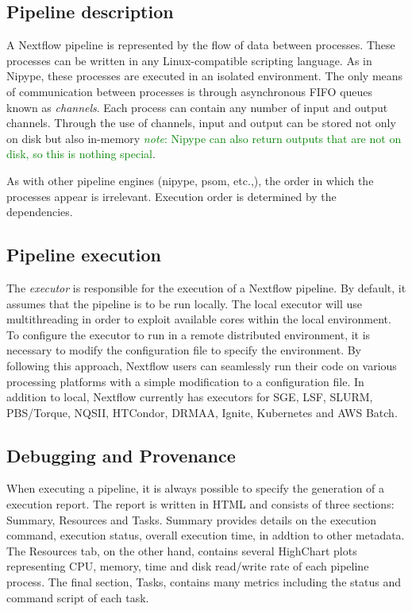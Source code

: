 \documentclass{report}
\newcommand{\note}[1]{\textcolor{green}{\textit{note}: #1}}
\begin{document}
        \subsection{Pipeline description}
        A Nextflow pipeline is represented by the flow of data between processes. These
processes can be written in any Linux-compatible scripting language. As in Nipype, 
these processes are executed in an isolated environment. The only means
of communication between processes is through asynchronous FIFO queues known as
\textit{channels}. Each process can contain any number of input and output
channels. Through the use of channels, input and output can be stored not only
on disk but also in-memory \note{Nipype can also return outputs that are not on
disk, so this is nothing special}.  

        As with other pipeline engines (nipype, psom, etc.,), the order in which
the processes appear is irrelevant. Execution order is determined by the dependencies.        

        \subsection{Pipeline execution}
        The \textit{executor} is responsible for the execution of a Nextflow
pipeline. By default, it assumes that the pipeline is to be run locally. The
local executor will use multithreading in order to exploit available cores
within the local environment. To configure the executor to run in a remote distributed environment, it is
necessary to modify the configuration file to specify the environment. By
following this approach, Nextflow users can seamlessly run their code on various
processing platforms with a simple modification to a configuration file. In
addition to local, Nextflow currently has executors for SGE, LSF, SLURM,
PBS/Torque, NQSII, HTCondor, DRMAA, Ignite, Kubernetes and AWS Batch.

        \subsection{Debugging and Provenance}
        When executing a pipeline, it is always possible to specify the
generation of a execution report. The report is written in HTML and consists of three sections:
Summary, Resources and Tasks. Summary provides details on the execution command,
execution status, overall execution time, in addtion to other metadata. The
Resources tab, on the other hand, contains several HighChart plots representing
CPU, memory, time and disk read/write rate of each pipeline process. The final
section, Tasks, contains many metrics including the status and command script of
each task. 
\end{document}
